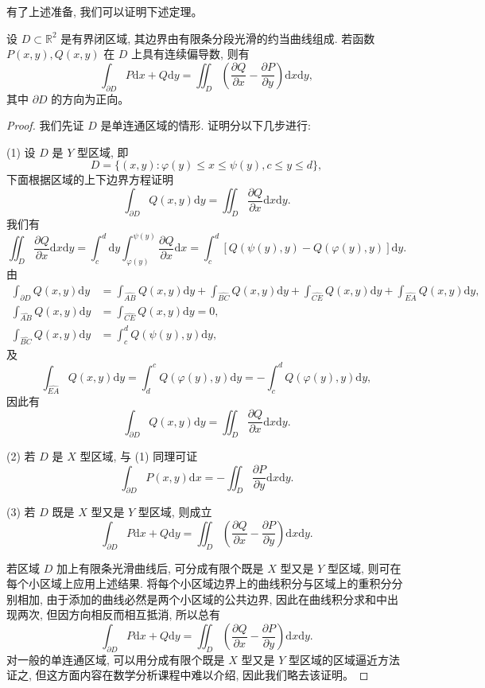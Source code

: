 \documentclass[UTF8,12pt,a4paper,fontset=fandol]{ctexart}
\begin{document}
有了上述准备, 我们可以证明下述定理。

\begin{theorem}[格林公式]\label{course-theorem-16-5-1}\quad 设 $D\subset\mathbb R^2$ 是有界闭区域, 其边界由有限条分段光滑的约当曲线组成. 若函数 $P(x,y),Q(x,y)$ 在 $D$ 上具有连续偏导数, 则有
\[
  \int_{\partial D}P\mathrm dx+Q\mathrm dy
  =\iint_D\left(\frac{\partial Q}{\partial x}-\frac{\partial P}{\partial y}\right)\mathrm dx\mathrm dy,
\]
其中 $\partial D$ 的方向为正向。

\end{theorem}
\begin{proof}\quad 我们先证 $D$ 是单连通区域的情形. 证明分以下几步进行:

(1) 设 $D$ 是 $Y$ 型区域, 即
\[
  D=\{(x,y):\varphi(y)\leqslant x\leqslant\psi(y),c\leqslant y\leqslant d\},
\]
下面根据区域的上下边界方程证明
\[
  \int_{\partial D}Q(x,y)\mathrm dy=\iint_D\frac{\partial Q}{\partial x}\mathrm dx\mathrm dy.
\]
我们有
\[
  \iint_D\frac{\partial Q}{\partial x}\mathrm dx\mathrm dy
  =\int_c^d\mathrm dy\int_{\varphi(y)}^{\psi(y)}
  \frac{\partial Q}{\partial x}\mathrm dx
  =\int_c^d[Q(\psi(y),y)-Q(\varphi(y),y)]\mathrm dy.
\]
由
\[
\begin{aligned}
  \int_{\partial D}Q(x,y)\mathrm dy
  &=\int_{\widehat{AB}}Q(x,y)\mathrm dy+\int_{\widehat{BC}}Q(x,y)\mathrm dy
    +\int_{\widehat{CE}}Q(x,y)\mathrm dy+\int_{\widehat{EA}}Q(x,y)\mathrm dy,\\
  \int_{\widehat{AB}}Q(x,y)\mathrm dy&=\int_{\widehat{CE}}Q(x,y)\mathrm dy=0,\\
  \int_{\widehat{BC}}Q(x,y)\mathrm dy&=\int_c^d Q(\psi(y),y)\mathrm dy,
\end{aligned}
\]
及
\[
  \int_{\widehat{EA}}Q(x,y)\mathrm dy
  =\int_d^cQ(\varphi(y),y)\mathrm dy
  =-\int_c^dQ(\varphi(y),y)\mathrm dy,
\]
因此有
\[
  \int_{\partial D}Q(x,y)\mathrm dy=\iint_D\frac{\partial Q}{\partial x}\mathrm dx\mathrm dy.
\]

(2) 若 $D$ 是 $X$ 型区域, 与 (1) 同理可证
\[
  \int_{\partial D}P(x,y)\mathrm dx=-\iint_D\frac{\partial P}{\partial y}\mathrm dx\mathrm dy.
\]

(3) 若 $D$ 既是 $X$ 型又是 $Y$ 型区域, 则成立
\[
  \int_{\partial D}P\mathrm dx+Q\mathrm dy
  =\iint_D\left(\frac{\partial Q}{\partial x}-\frac{\partial P}{\partial y}\right)\mathrm dx\mathrm dy.
\]

若区域 $D$ 加上有限条光滑曲线后, 可分成有限个既是 $X$ 型又是 $Y$ 型区域, 则可在每个小区域上应用上述结果. 将每个小区域边界上的曲线积分与区域上的重积分分别相加, 由于添加的曲线必然是两个小区域的公共边界, 因此在曲线积分求和中出现两次, 但因方向相反而相互抵消, 所以总有
\[
  \int_{\partial D}P\mathrm dx+Q\mathrm dy
  =\iint_D\left(\frac{\partial Q}{\partial x}-\frac{\partial P}{\partial y}\right)\mathrm dx\mathrm dy.
\]
对一般的单连通区域, 可以用分成有限个既是 $X$ 型又是 $Y$ 型区域的区域逼近方法证之, 但这方面内容在数学分析课程中难以介绍, 因此我们略去该证明。


\end{proof}
\end{document}
